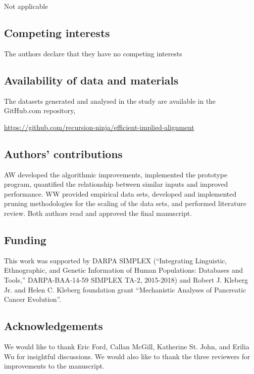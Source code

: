 \documentclass{bmcart}
\begin{document}
    Not applicable   

  \subsection*{Competing interests}

    The authors declare that they have no competing interests

  \subsection*{Availability of data and materials}
  
    The datasets generated and analysed in the study are available in the GitHub.com repository,
    
    \centerline{\url{https://github.com/recursion-ninja/efficient-implied-alignment}}

  \subsection*{Authors' contributions}
  
    AW developed the algorithmic improvements, implemented the prototype program, quantified the relationship between similar inputs and improved performance.
    WW provided empirical data sets, developed and implemented pruning methodologies for the scaling of the data sets, and performed literature review.
    Both authors read and approved the final manuscript.
    
  \subsection*{Funding}

    This work was supported by DARPA SIMPLEX (``Integrating Linguistic, Ethnographic, and Genetic Information of Human Populations: Databases and Tools,'' DARPA-BAA-14-59 SIMPLEX TA-2, 2015-2018) and Robert J. Kleberg Jr. and Helen C. Kleberg foundation grant ``Mechanistic Analyses of Pancreatic Cancer Evolution''.

  \subsection*{Acknowledgements}
	
    We would like to thank Eric Ford, Callan McGill, Katherine St. John, and Erilia Wu for insightful discussions. We would also like to thank the three reviewers for improvements to the manuscript.
\end{document}
